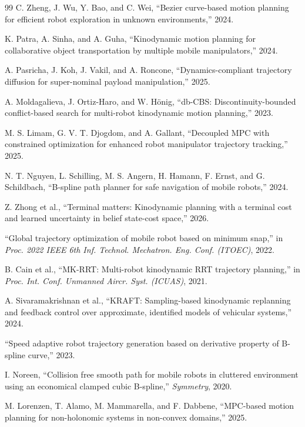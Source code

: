 \begin{thebibliography}{99}
C. Zheng, J. Wu, Y. Bao, and C. Wei, ``Bezier curve-based motion planning for efficient robot exploration in unknown environments,'' 2024.

K. Patra, A. Sinha, and A. Guha, ``Kinodynamic motion planning for collaborative object transportation by multiple mobile manipulators,'' 2024.

A. Pasricha, J. Koh, J. Vakil, and A. Roncone, ``Dynamics-compliant trajectory diffusion for super-nominal payload manipulation,'' 2025.

A. Moldagalieva, J. Ortiz-Haro, and W. Hönig, ``db-CBS: Discontinuity-bounded conflict-based search for multi-robot kinodynamic motion planning,'' 2023.

M. S. Limam, G. V. T. Djogdom, and A. Gallant, ``Decoupled MPC with constrained optimization for enhanced robot manipulator trajectory tracking,'' 2025.

N. T. Nguyen, L. Schilling, M. S. Angern, H. Hamann, F. Ernst, and G. Schildbach, ``B-spline path planner for safe navigation of mobile robots,'' 2024.

Z. Zhong et al., ``Terminal matters: Kinodynamic planning with a terminal cost and learned uncertainty in belief state-cost space,'' 2026.

``Global trajectory optimization of mobile robot based on minimum snap,'' in \emph{Proc. 2022 IEEE 6th Inf. Technol. Mechatron. Eng. Conf. (ITOEC)}, 2022.

B. Cain et al., ``MK-RRT: Multi-robot kinodynamic RRT trajectory planning,'' in \emph{Proc. Int. Conf. Unmanned Aircr. Syst. (ICUAS)}, 2021.

A. Sivaramakrishnan et al., ``KRAFT: Sampling-based kinodynamic replanning and feedback control over approximate, identified models of vehicular systems,'' 2024.

``Speed adaptive robot trajectory generation based on derivative property of B-spline curve,'' 2023.

I. Noreen, ``Collision free smooth path for mobile robots in cluttered environment using an economical clamped cubic B-spline,'' \emph{Symmetry}, 2020.

M. Lorenzen, T. Alamo, M. Mammarella, and F. Dabbene, ``MPC-based motion planning for non-holonomic systems in non-convex domains,'' 2025.


\end{thebibliography}
